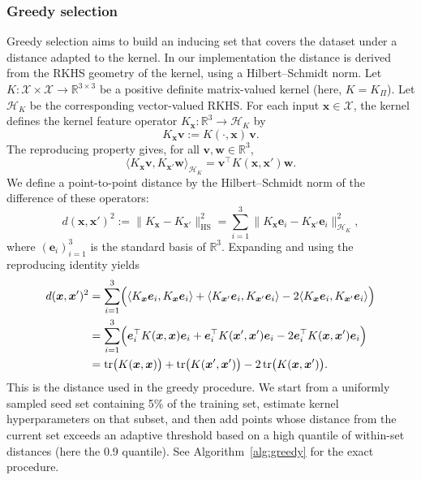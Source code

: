 \documentclass[11pt,a4paper]{article}
\newcommand{\bx}{\boldsymbol{x}}
\begin{document}

\subsubsection{Greedy selection}
\label{subsubsec:greedy}
Greedy selection aims to build an inducing set that {covers} the dataset under a distance adapted to the kernel. In our implementation the distance is derived from the RKHS geometry of the kernel, using a Hilbert--Schmidt norm. Let $K:\mathcal{X}\times\mathcal{X}\to\mathbb{R}^{3\times 3}$ be a positive definite matrix-valued kernel (here, $K=K_{\Pi}$). Let $\mathcal{H}_K$ be the corresponding vector-valued RKHS. For each input $\bx\in\mathcal{X}$, the kernel defines the kernel feature operator $K_{\bx}:\mathbb{R}^3\to\mathcal{H}_K$ by
\begin{displaymath}K_{\bx} \boldsymbol{v} := K(\cdot,\bx)\,\boldsymbol{v}.\end{displaymath}
The reproducing property gives, for all $\boldsymbol{v},\boldsymbol{w}\in\mathbb{R}^3$,
\begin{displaymath}\langle K_{\bx} \boldsymbol{v}, K_{\bx'} \boldsymbol{w}\rangle_{\mathcal{H}_K} = \boldsymbol{v}^\top K(\bx,\bx') \boldsymbol{w}.\end{displaymath}
We define a point-to-point distance by the Hilbert--Schmidt norm of the difference of these operators:
\begin{displaymath}d(\bx,\bx')^2 := \|K_{\bx} - K_{\bx'}\|_{\mathrm{HS}}^2 = \sum_{i=1}^3 \|K_{\bx} \boldsymbol{e}_i - K_{\bx'} \boldsymbol{e}_i\|_{\mathcal{H}_K}^2,\end{displaymath}
where $(\boldsymbol{e}_i)_{i=1}^3$ is the standard basis of $\mathbb{R}^3$.
Expanding and using the reproducing identity yields
\begin{align*}
d(\bx,\bx')^2
&= \sum_{i=1}^3 \Bigl(
\langle K_{\bx} \boldsymbol{e}_i, K_{\bx} \boldsymbol{e}_i\rangle
+
\langle K_{\bx'} \boldsymbol{e}_i, K_{\bx'} \boldsymbol{e}_i\rangle
-
2\langle K_{\bx} \boldsymbol{e}_i, K_{\bx'} \boldsymbol{e}_i\rangle
\Bigr)\\
&= \sum_{i=1}^3 \Bigl(
\boldsymbol{e}_i^\top K(\bx,\bx) \boldsymbol{e}_i
+
\boldsymbol{e}_i^\top K(\bx',\bx') \boldsymbol{e}_i
-
2 \boldsymbol{e}_i^\top K(\bx,\bx') \boldsymbol{e}_i
\Bigr)\\
&= \mathrm{tr}\bigl(K(\bx,\bx)\bigr) + \mathrm{tr}\bigl(K(\bx',\bx')\bigr) - 2\,\mathrm{tr}\bigl(K(\bx,\bx')\bigr).
\end{align*}
This is the distance used in the greedy procedure. We start from a uniformly sampled seed set containing 5\% of the training set, estimate kernel hyperparameters on that subset, and then add points whose distance from the current set exceeds an adaptive threshold based on a high quantile of within-set distances (here the 0.9 quantile). See Algorithm~\ref{alg:greedy} for the exact procedure.
\end{document}
